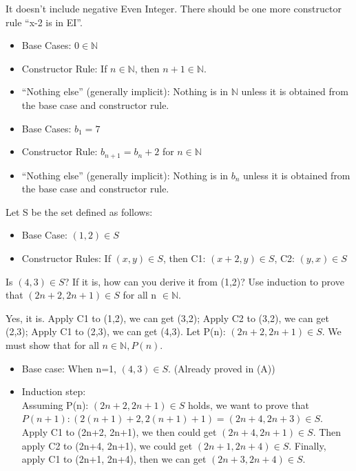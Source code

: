 \documentclass[solution, letterpaper]{cs20inclass}
\begin{document}
\begin{solution}
\subsolution  It doesn't include negative Even Integer. There should be one more constructor rule “x-2 is in EI”.
\subsolution 
\begin{itemize}
\item Base Cases:  $0\in \mathbb{N}$
\item Constructor Rule: If $n\in\mathbb{N}$, then $n+1\in\mathbb{N}$.
\item “Nothing else” (generally implicit): Nothing is in $\mathbb{N}$ unless it is obtained from the base case and constructor rule.
\end{itemize}
\subsolution
\begin{itemize}
\item Base Cases:  $b_1=7$
\item Constructor Rule: $b_{n+1}=b_n+2$ for $n\in\mathbb{N}$
\item “Nothing else” (generally implicit): Nothing is in $b_n$ unless it is obtained from the base case and constructor rule.
\end{itemize}
\end{solution}

\problem Let S be the set defined as follows:
\begin{itemize}
\item Base Case: $(1,2) \in S$
\item Constructor Rules: If $(x,y)\in S$, then C1: $(x+2, y) \in S$, C2: $(y,x) \in S$ 
\end{itemize}
\subproblem Is $(4,3)\in S$? If it is, how can you derive it from (1,2)?
\subproblem Use induction to prove that $(2n+2, 2n+1)\in S$ for all n $\in \mathbb{N}$.

\begin{solution}
\subsolution Yes, it is. Apply C1 to (1,2), we can get (3,2); Apply C2 to (3,2), we can get (2,3); Apply C1 to (2,3), we can get (4,3).
\subsolution Let P(n): $(2n+2, 2n+1)\in S$. We must show that for all $n\in\mathbb{N}, P(n)$.
\begin{itemize}
\item Base case: When n=1, $(4,3)\in S$. (Already proved in (A))
\item Induction step: \\
Assuming P(n): $(2n+2, 2n+1)\in S$ holds, we want to prove that $P(n+1): (2(n+1)+2, 2(n+1)+1)=(2n+4, 2n+3)\in S$.\\
Apply C1 to (2n+2, 2n+1), we then could get $(2n+4, 2n+1)\in S$. Then apply C2 to (2n+4, 2n+1), we could get $(2n+1, 2n+4)\in S$. Finally, apply C1 to (2n+1, 2n+4), then we can get $(2n+3, 2n+4)\in S$.
\end{itemize}
\end{solution}
\end{document}
